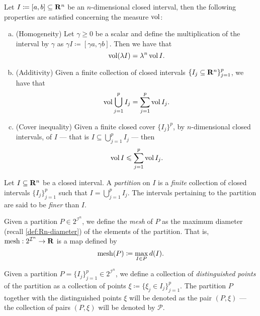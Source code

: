\begin{corollary}
    \label{cor:interval-measure-properties}
    Let \(I \coloneq [a, b] \subseteq \mathbf{R}^n\) be an \(n\)-dimensional closed
    interval, then the following properties are satisfied concerning the measure
    \(\operatorname{vol}\):
    \begin{enumerate}[(a)]\setlength\itemsep{0em}
        \item (Homogeneity) Let \(\gamma \geq 0\) be a scalar and define the
              multiplication of the interval by \(\gamma\) as \(\gamma I \coloneq [\gamma
                  a, \gamma b]\). Then we have that
              \[
                  \operatorname{vol}(\lambda I) = \lambda^n \operatorname{vol} I.
              \]
        \item (Additivity) Given a finite collection of closed intervals \(\{I_{j}
              \subseteq \mathbf{R}^n\}_{j = 1}^p\), we have that
              \[
                  \operatorname{vol} \bigcup_{j=1}^p I_j = \sum_{j=1}^p \operatorname{vol} I_j.
              \]
        \item (Cover inequality) Given a finite closed cover \(\{I_{j}\}^{p}\), by
              \(n\)-dimensional closed intervals, of \(I\) --- that is \(I \subseteq
              \bigcup_{j=1}^p I_j\) --- then
              \[
                  \operatorname{vol} I \leqslant \sum_{j=1}^p \operatorname{vol} I_j.
              \]
    \end{enumerate}
\end{corollary}

\begin{definition}[Partition]
    \label{def:interval-partition}
    Let \(I \subseteq \mathbf{R}^n\) be a closed interval. A \emph{partition} on \(I\) is a
    \emph{finite} collection of closed intervals \(\{I_{j}\}_{j=1}^p\) such that \(I
    = \bigcup_{j=1}^p I_j\). The intervals pertaining to the partition are said to
    be \emph{finer} than \(I\).
\end{definition}

\begin{definition}
    \label{def:partition-mesh}
    Given a partition \(P \in 2^{\mathcal I^n}\), we define the \emph{mesh} of \(P\)
    as the maximum diameter (recall \cref{def:Rn-diameter}) of the elements of the
    partition. That is, \(\operatorname{mesh}: 2^{\mathcal I^n} \to \mathbf{R}\) is a map defined by
    \[
        \operatorname{mesh}(P) \coloneq \max_{I \in P} d(I).
    \]
\end{definition}

\begin{definition}
    \label{def:distinguished-points}
    Given a partition \(P = \{I_{j}\}_{j=1}^p \in 2^{\mathcal I^n}\), we define a
    collection of \emph{distinguished points} of the partition as a collection of
    points \(\xi \coloneq \{\xi_j \in I_{j}\}_{j=1}^p\). The partition \(P\)
    together with the distinguished points \(\xi\) will be denoted as the pair \((P,
    \xi)\) --- the collection of pairs \((P, \xi)\) will be denoted by \(\mathcal
    P\).
\end{definition}

